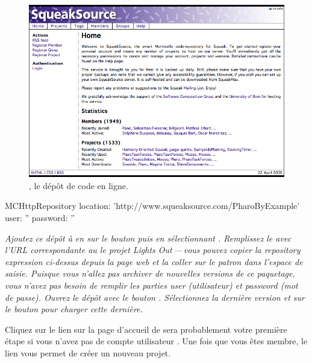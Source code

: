 \documentclass[a4paper,10pt,twoside]{book}
\begin{document}
\begin{figure}[ht]\centering
	\includegraphics[width=\textwidth]{squeaksource2}
	\caption{\sqsrc, le dépôt de code \MC en ligne.}
\end{figure}


\begin{code}{}
MCHttpRepository
    location: 'http://www.squeaksource.com/PharoByExample'
    user: ''
    password: ''
\end{code}
\noindent
\emph{Ajoutez ce dépôt à \MC en \clickant{} sur le bouton
   puis en sélectionnant . 
Remplissez le 
avec l'URL correspondante au le projet Lights Out\,---\,vous
pouvez copier la \emph{repository expression} ci-dessus depuis la
page web et la coller sur le patron dans l'espace de saisie.
Puisque vous n'allez pas archiver de nouvelles versions de ce
paquetage, vous n'avez pas besoin de remplir les parties \emph{user}
(utilisateur) et \emph{password} (mot de passe).
Ouvrez le dépôt avec le bouton
. Sélectionnez la dernière version et \clickz{} sur le
bouton  pour charger cette dernière.}

Cliquez %
sur le lien  sur la page d'accueil 
de \sqsrc sera probablement votre première étape si vous n'avez pas de
compte utilisateur  \sqsrc.
Une fois que vous êtes membre, le lien
 vous permet de créer un nouveau projet.
\end{document}
